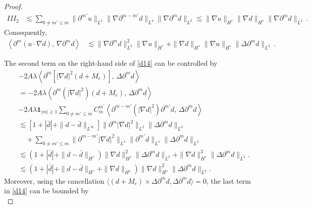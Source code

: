 \documentclass[reqno,11pt]{amsart}
\numberwithin{equation}{section}
\def\p{\partial}
\begin{document}
\begin{proof}
\begin{equation*}
\begin{aligned}
 III_2&\lesssim \sum_{0 \neq m' \leq m} \| \partial^{m'} u \|_{L^4} \| \nabla \partial^{m - m'} d \|_{L^4} \| \nabla \partial^m d \|_{L^2} \lesssim \| \nabla u \|_{H^s} \| \nabla d \|_{H^s} \| \nabla \partial^m d \|_{L^2} \,.
\end{aligned}
\end{equation*}
Consequently,
\begin{equation}\label{nd1}
\begin{aligned}
\left\langle \partial^m (u \cdot \nabla d),\, \nabla \partial^m d \right\rangle &\lesssim \| \nabla \partial^m d \|_{L^2}^2 \| \nabla u \|_{H^s} + \| \nabla d \|_{H^s} \| \nabla u \|_{H^s} \| \Delta \partial^m d \|_{L^2}\,.
\end{aligned}
\end{equation}

The second term on the right-hand side of \eqref{d14} can be controlled by
\begin{equation}\label{nd2}
\begin{aligned}
&- 2A\lambda \left\langle \partial^m \left[ |\nabla d|^2 (d +M_e) \right],\, \Delta\partial^m d \right\rangle \\
& = -2A\lambda  \left\langle \partial^m (|\nabla d|^2) (d +M_e),\, \Delta \partial^m d \right\rangle \\
&- 2A\lambda  \mathbf{1}_{|m|\geq 1}\sum_{0 \neq m' \leq m} C^{m^\prime}_m\left\langle \partial^{m - m'} (|\nabla d|^2) \partial^{m'} d,\, \Delta \partial^m d \right\rangle \\
&\lesssim \left[ 1 + |\bar{d}| + \| d - \bar{d} \|_{L^\infty} \right] \| \partial^m |\nabla d|^2 \|_{L^2} \| \Delta \partial^m d \|_{L^2} \\
&\quad + \sum_{0 \neq m' \leq m} \| \partial^{m - m'} |\nabla d|^2 \|_{L^4} \| \partial^{m'} d \|_{L^4} \| \Delta\partial^m d \|_{L^2}\\
&\lesssim \left( 1 + |\bar{d}| + \| d - \bar{d} \|_{H^s} \right) \| \nabla d \|_{H^s}^2 \| \Delta \partial^m d \|_{L^2} + \| \nabla d \|_{H^s}^3 \| \Delta\partial^m d \|_{L^2}. \\
&\lesssim \left( 1 + |\bar{d}| + \| d - \bar{d} \|_{H^s} + \| \nabla d \|_{H^s} \right) \| \nabla d \|_{H^s}^2 \| \Delta \partial^m d \|_{L^2}.
\end{aligned}
\end{equation}
Moreover, using the cancellation $\langle(d+M_e)\times\Delta\p^m d ,\Delta \p^m d \rangle=0$, the last term in \eqref{d14} can be bounded by
\begin{equation}\label{nd3}

\end{equation}
\end{proof}
\end{document}
